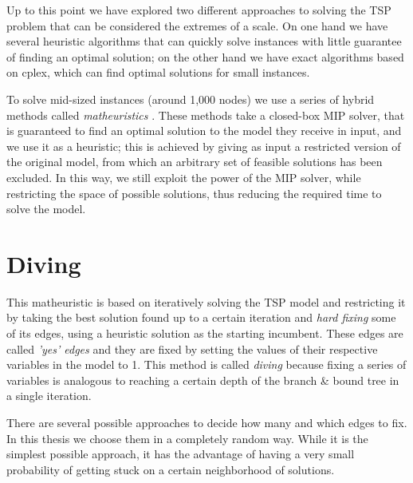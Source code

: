 Up to this point we have explored two different approaches to solving the TSP problem that can be considered the extremes of a scale. On one hand we have several heuristic algorithms that can quickly solve instances with little guarantee of finding an optimal solution; on the other hand we have exact algorithms based on cplex, which can find optimal solutions for small instances.

To solve mid-sized instances (around 1,000 nodes) we use a series of hybrid methods called \textit{matheuristics} \cite{Fischetti2016}. These methods take a closed-box MIP solver, that is guaranteed to find an optimal solution to the model they receive in input, and we use it as a heuristic; this is achieved by giving as input a restricted version of the original model, from which an arbitrary set of feasible solutions has been excluded. In this way, we still exploit the power of the MIP solver, while restricting the space of possible solutions, thus reducing the required time to solve the model.

\section{Diving}

This matheuristic is based on iteratively solving the TSP model and restricting it by taking the best solution found up to a certain iteration and \textit{hard fixing} some of its edges, using a heuristic solution as the starting incumbent. These edges are called \textit{'yes' edges} and they are fixed by setting the values of their respective variables in the model to 1. This method is called \textit{diving} because fixing a series of variables is analogous to reaching a certain depth of the branch \& bound tree in a single iteration.

There are several possible approaches to decide how many and which edges to fix. In this thesis we choose them in a completely random way. While it is the simplest possible approach, it has the advantage of having a very small probability of getting stuck on a certain neighborhood of solutions.

\newpage


